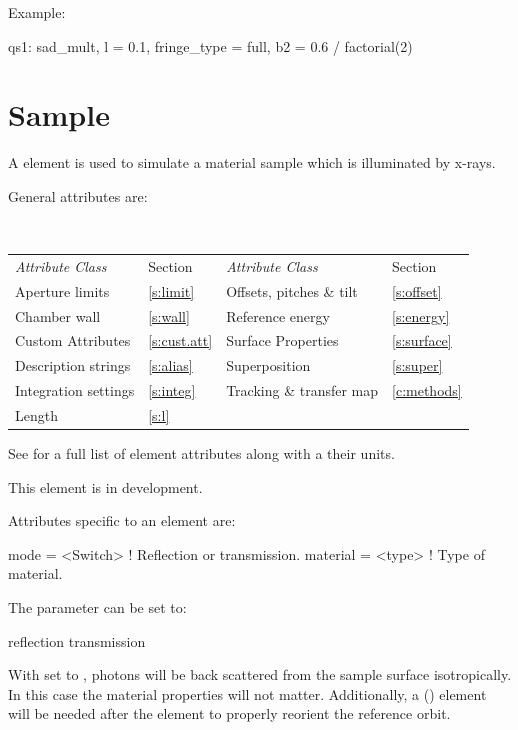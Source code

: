 {Example:
\begin{example}
  qs1: sad_mult, l = 0.1, fringe_type = full, b2 = 0.6 / factorial(2)
\end{example}

\newpage

\section{Sample}
\label{s:sample}

A  element is used to simulate a material sample which is illuminated by x-rays.

General  attributes are:
\begin{center}
\tt
\begin{tabular}{llll} \toprule
  {\sl Attribute Class}      & Section           & {\sl Attribute Class}      & Section         \\
  Aperture limits            & \ref{s:limit}     & Offsets, pitches \& tilt   & \ref{s:offset}  \\ \midrule
  Chamber wall               & \ref{s:wall}      & Reference energy           & \ref{s:energy}  \\ 
  Custom Attributes          & \ref{s:cust.att}  & Surface Properties         & \ref{s:surface} \\
  Description strings        & \ref{s:alias}     & Superposition              & \ref{s:super}   \\
  Integration settings       & \ref{s:integ}     & Tracking \& transfer map   & \ref{c:methods} \\
  Length                     & \ref{s:l}         &                            &                 \\
  \bottomrule
\end{tabular}
\end{center}
\toffset
See  for a full list of element attributes along with a their units.

This element is in development.

Attributes specific to an  element are:
\begin{example}
  mode       = <Switch> ! Reflection or transmission.
  material   = <type>   ! Type of material. 
\end{example}

The  parameter can be set to:
\begin{example}
  reflection
  transmission
\end{example}
With  set to , photons will be back scattered
from the sample surface isotropically. In this case the material
properties will not matter. Additionally, a 
() element will be needed after the  element
to properly reorient the reference orbit.

}
